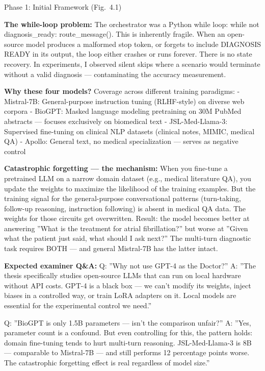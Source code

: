 \documentclass[aspectratio=169,11pt]{beamer}
\begin{document}
\begin{frame}{Phase 1: Initial Framework (Fig.\ 4.1)}
{\textbf{The while-loop problem:} The orchestrator was a Python while loop: while not diagnosis\_ready: route\_message(). This is inherently fragile. When an open-source model produces a malformed stop token, or forgets to include DIAGNOSIS READY in its output, the loop either crashes or runs forever. There is no state recovery. In experiments, I observed silent skips where a scenario would terminate without a valid diagnosis — contaminating the accuracy measurement.

\textbf{Why these four models?} Coverage across different training paradigms:
- Mistral-7B: General-purpose instruction tuning (RLHF-style) on diverse web corpora
- BioGPT: Masked language modeling pretraining on 30M PubMed abstracts — focuses exclusively on biomedical text
- JSL-Med-Llama-3: Supervised fine-tuning on clinical NLP datasets (clinical notes, MIMIC, medical QA)
- Apollo: General text, no medical specialization — serves as negative control

\textbf{Catastrophic forgetting — the mechanism:} When you fine-tune a pretrained LLM on a narrow domain dataset (e.g., medical literature QA), you update the weights to maximize the likelihood of the training examples. But the training signal for the general-purpose conversational patterns (turn-taking, follow-up reasoning, instruction following) is absent in medical QA data. The weights for those circuits get overwritten. Result: the model becomes better at answering ''What is the treatment for atrial fibrillation?'' but worse at ''Given what the patient just said, what should I ask next?'' The multi-turn diagnostic task requires BOTH — and general Mistral-7B has the latter intact.

\textbf{Expected examiner Q\&A:}
Q: ''Why not use GPT-4 as the Doctor?''
A: ''The thesis specifically studies open-source LLMs that can run on local hardware without API costs. GPT-4 is a black box — we can't modify its weights, inject biases in a controlled way, or train LoRA adapters on it. Local models are essential for the experimental control we need.''

Q: ''BioGPT is only 1.5B parameters — isn't the comparison unfair?''
A: ''Yes, parameter count is a confound. But even controlling for this, the pattern holds: domain fine-tuning tends to hurt multi-turn reasoning. JSL-Med-Llama-3 is 8B — comparable to Mistral-7B — and still performs 12 percentage points worse. The catastrophic forgetting effect is real regardless of model size.''
}
\end{frame}
\end{document}
